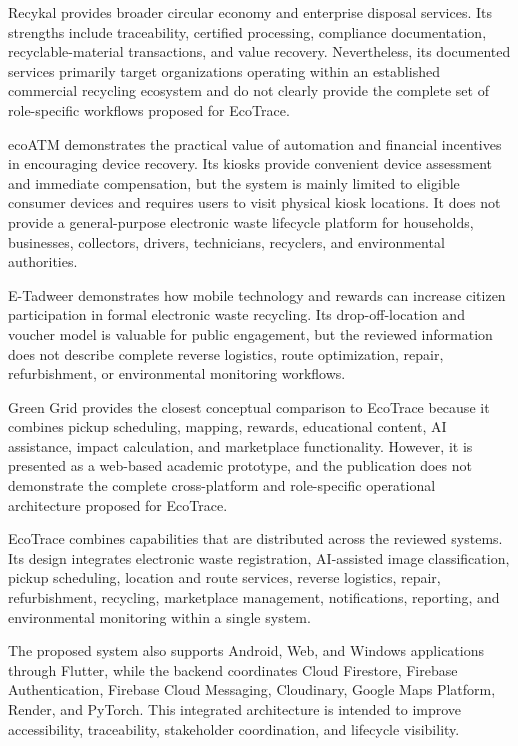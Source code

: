 Recykal provides broader circular economy and enterprise disposal services.
Its strengths include traceability, certified processing, compliance documentation,
recyclable-material transactions, and value recovery. Nevertheless, its
documented services primarily target organizations operating within an
established commercial recycling ecosystem and do not clearly provide the
complete set of role-specific workflows proposed for EcoTrace.

ecoATM demonstrates the practical value of automation and financial
incentives in encouraging device recovery. Its kiosks provide convenient device
assessment and immediate compensation, but the system is mainly limited to
eligible consumer devices and requires users to visit physical kiosk locations. It
does not provide a general-purpose electronic waste lifecycle platform for
households, businesses, collectors, drivers, technicians, recyclers, and
environmental authorities.

E-Tadweer demonstrates how mobile technology and rewards can increase
citizen participation in formal electronic waste recycling. Its drop-off-location and
voucher model is valuable for public engagement, but the reviewed information
does not describe complete reverse logistics, route optimization, repair,
refurbishment, or environmental monitoring workflows.

Green Grid provides the closest conceptual comparison to EcoTrace because it
combines pickup scheduling, mapping, rewards, educational content, AI
assistance, impact calculation, and marketplace functionality. However, it is
presented as a web-based academic prototype, and the publication does not
demonstrate the complete cross-platform and role-specific operational
architecture proposed for EcoTrace.

EcoTrace combines capabilities that are distributed across the reviewed
systems. Its design integrates electronic waste registration, AI-assisted image
classification, pickup scheduling, location and route services, reverse logistics,
repair, refurbishment, recycling, marketplace management, notifications,
reporting, and environmental monitoring within a single system.

The proposed system also supports Android, Web, and Windows applications
through Flutter, while the backend coordinates Cloud Firestore, Firebase
Authentication, Firebase Cloud Messaging, Cloudinary, Google Maps Platform,
Render, and PyTorch. This integrated architecture is intended to improve
accessibility, traceability, stakeholder coordination, and lifecycle visibility.

